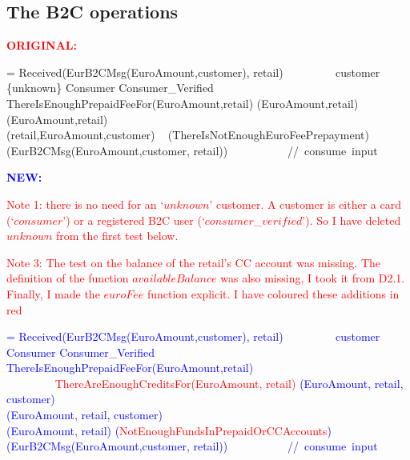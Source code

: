  \subsection{The B2C operations}
 
 \textcolor{red}{\bf ORIGINAL:}
 
 \begin{asm}
 =\+
 \IF Received(EurB2CMsg(EuroAmount,\FROM customer), \FROM retail) \AND \+
 ~~~~~~~~
 customer \in  \{unknown\} \cup Consumer \cup Consumer\_Verified \THEN \\
 \IF ThereIsEnoughPrepaidFeeFor(EuroAmount,retail) \THEN \+
 (EuroAmount,retail)\\
 (EuroAmount,\FOR retail) \\ 
 (retail,EuroAmount,customer)\-
 \ELSE ~ (ThereIsNotEnoughEuroFeePrepayment)    \\
 (EurB2CMsg(EuroAmount,\FROM customer, \FOR retail)) 
 \mbox{~~~~~~~~~ // consume input} 
\end{asm}

\textcolor{blue}{\bf NEW:}

 \textcolor{red}{Note 1: there is no need for an `$unknown$' customer. A customer is either a card (`$consumer$') or a registered B2C user (`$consumer$\_$verified$'). So I have deleted $unknown$ from the first test below.}

\textcolor{red}{Note 3: The test on the balance of the retail's CC account was missing. The definition of the function $availableBalance$ was also missing, I took it from D2.1. Finally, I made the $euroFee$ function explicit. I have coloured these additions in red}

\textcolor{blue}{
\begin{asm}
 = \+
	\IF Received(EurB2CMsg(EuroAmount,\FROM customer), \FROM retail) \AND \+
		~~~~~~~~
		customer \in  Consumer \cup Consumer\_Verified \THEN \\
		\IF ThereIsEnoughPrepaidFeeFor(EuroAmount,retail) \\
			~~~~~~~~ \textcolor{red}{\AND ThereAreEnoughCreditsFor(EuroAmount, retail)} \THEN \+
			(EuroAmount, retail, customer)\\
			(EuroAmount, retail, customer)\\
			(EuroAmount, retail) \-
		\ELSE\+
			(\textcolor{red}{NotEnoughFundsInPrepaidOrCCAccounts}) \dec\-
(EurB2CMsg(EuroAmount,\FROM customer, \FROM retail)) 
	\mbox{~~~~~~~~~ // consume input} 
\end{asm}
}
 
